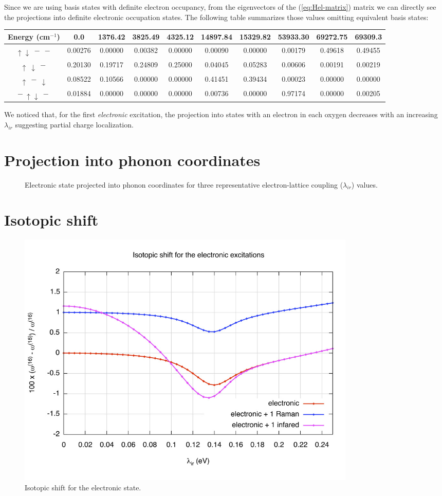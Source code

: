Since we are using basis states with definite electron occupancy, from the eigenvectors of the (\ref{eq:Hel-matrix}) matrix we can directly see the projections into definite electronic occupation states. The following table summarizes those values omitting equivalent basis states:

\noindent\begin{tabular}{| c | c | c | c | c | c | c | c | c | c |}
\hline
Energy (cm$^{-1}$) & 0.0 & 1376.42 & 3825.49 & 4325.12 & 14897.84 & 15329.82 & 53933.30 & 69272.75 & 69309.3 \\
\hline
$\uparrow \downarrow \ - \ -$ & 0.00276 & 0.00000 & 0.00382 & 0.00000 & 0.00090 & 0.00000 & 0.00179 & 0.49618 & 0.49455 \\
$\uparrow\  \downarrow \ -$ & 0.20130 & 0.19717 & 0.24809 & 0.25000 & 0.04045 & 0.05283 & 0.00606 & 0.00191 & 0.00219 \\
$\uparrow \ - \ \downarrow$ & 0.08522 & 0.10566 & 0.00000 & 0.00000 & 0.41451 & 0.39434 & 0.00023 & 0.00000 & 0.00000 \\
$ - \ \uparrow \downarrow \ -$ & 0.01884 & 0.00000 & 0.00000 & 0.00000 & 0.00736 & 0.00000 & 0.97174 & 0.00000 & 0.00205 \\
\hline
\end{tabular}

We noticed\cite{GarciaSaraviaOrtizdeMontellano2013} that, for the first \textit{electronic} excitation, the projection into states with an electron in each oxygen decreases with an increasing $\lambda_{ir}$ suggesting partial charge localization.

\section{Projection into phonon coordinates}

\begin{figure}[ht!]
  \centering
  
  \caption{Electronic state projected into phonon coordinates for three representative electron-lattice coupling ($\lambda_{ir}$) values.}
  \label{fig:phononProjElectr}
\end{figure}

\section{Isotopic shift}

\begin{figure}[ht!]
\centering
\includegraphics[width=0.8\textwidth]{images/isot-el.jpg}
\caption{Isotopic shift for the electronic state.}
\label{fig:isot-el}
\end{figure}

